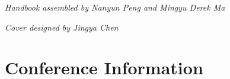 \documentclass[twoside,makeidx]{book}
\begin{document}


\fancyfoot[C]{}
% 



\thispagestyle{empty}

% 

\vspace*{15.3em}
\noindent\emph{Handbook assembled by Nanyun Peng and Mingyu Derek Ma}\\ 

\noindent\emph{Cover designed by Jingya Chen}\\

\newpage
\cleardoublepage
\fancyfoot[C]{\thepage}
\frontmatter





\setcounter{tocdepth}{1}
\tableofcontents
\mainmatter
\pagestyle{fancy}


\chapter{Conference Information}


\clearpage


\clearpage%
\setheaders{}{}


\clearpage


% 
\end{document}
